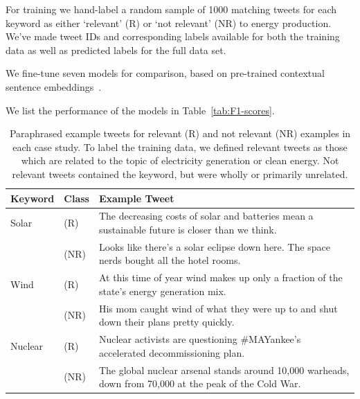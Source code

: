 For training we hand-label a random sample of 1000 matching tweets
for each keyword
as either `relevant' (R)  or `not relevant' (NR) to energy production. 
We've made tweet IDs and corresponding labels available for both the training data 
as well as predicted labels for the full data set.


We fine-tune seven models for comparison, based on pre-trained contextual sentence embeddings~\cite{song2020mpnet, wang2020minilm, }.

We list the performance of the models in Table~\ref{tab:F1-scores}.



\begin{table}[t]
    \begin{tabular}{  l p{1.1cm} p{4.55cm} }
        \toprule
        \textbf{Keyword} & \textbf{Class}     
        & \textbf{Example Tweet}   \\\midrule
    Solar & (R)
            &  The decreasing costs of solar and batteries mean a sustainable future is closer than we think.  \\ \cmidrule(lr){2-3} 
        & (NR)      
            & Looks like there's a solar eclipse down here. The space nerds bought all the hotel rooms.    \\\midrule
    Wind & (R)      
            & At this time of year wind makes up only a fraction of the state's energy generation mix.  \\ \cmidrule(lr){2-3} 
        & (NR)      
            & His mom caught wind of what they were up to and shut down their plans pretty quickly. \\\midrule
    Nuclear & (R)
            & Nuclear activists are questioning \#MAYankee's accelerated decommissioning plan. \\ \cmidrule(lr){2-3} 
        &  (NR)      
            & The global nuclear arsenal stands around 10,000 warheads, down from 70,000 at the peak of the Cold War. \\
        \bottomrule
    \end{tabular}
    \caption{Paraphrased example tweets for relevant (R) and not relevant (NR) examples in each case study. To label the training data, we defined relevant tweets as those which are related to the topic of electricity generation or clean energy. Not relevant tweets contained the keyword, but were wholly or primarily unrelated.
    }
    \label{tab:example_tweets}
\end{table}


